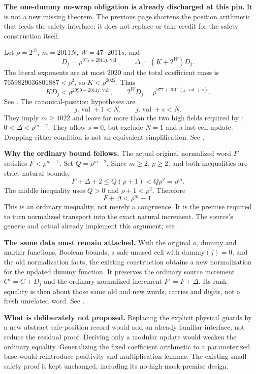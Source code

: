 \textbf{The one-dummy no-wrap obligation is already discharged at this pin.} It is not a new missing theorem. The previous page shortens the position arithmetic that feeds the safety interface; it does not replace or take credit for the safety construction itself.

Let $\rho=2^{47}$, $m=2011N$, $W=47\cdot2011s$, and
\[
 D_j=\rho^{977+2011j.\operatorname{val}},\qquad
 \Delta=(K+2^W)D_j.
\]
The literal exponents are at most $2020$ and the total coefficient mass is $7659829036801887<\rho^2$, so $K<\rho^{2022}$. Thus
\[
 KD_j<\rho^{2999+2011j.\operatorname{val}},\qquad
 2^WD_j=\rho^{977+2011(j.\operatorname{val}+s)}.
\]
See . The canonical-position hypotheses are
\[
 j.\operatorname{val}+1<N,\qquad j.\operatorname{val}+s<N.
\]
They imply $m\ge4022$ and leave far more than the two high fields required by
: $0<\Delta<\rho^{m-2}$. They allow $s=0$, but exclude $N=1$ and a last-cell update. Dropping either condition is not an equivalent simplification. See .

\textbf{Why the ordinary bound follows.} The actual original normalized word $F$ satisfies $F<\rho^{m-1}$. Set $Q=\rho^{m-2}$. Since $m\ge2$, $\rho\ge2$, and both inequalities are strict natural bounds,
\[
 F+\Delta+2\le Q(\rho+1)<Q\rho^2=\rho^m.
\]
The middle inequality uses $Q>0$ and $\rho+1<\rho^2$. Therefore
\[
 F+\Delta<\rho^m-1.
\]
This is an ordinary inequality, not merely a congruence. It is the premise required to turn normalized transport into the exact natural increment. The source's generic  and actual  already implement this argument; see .

\textbf{The same data must remain attached.} With the original $a$, dummy and marker functions, Boolean bounds, a safe unused cell with $\mathrm{dummy}(j)=0$, and the old normalization facts, the existing construction obtains a new normalization for the updated dummy function. It preserves the ordinary source increment $C'=C+D_j$ and the ordinary normalized increment $F'=F+\Delta$. Its rank equality is then about those same old and new words, carries and digits, not a fresh unrelated word. See .

\textbf{What is deliberately not proposed.} Replacing the explicit physical guards by a new abstract safe-position record would add an already familiar interface, not reduce the residual proof. Deriving only a modular update would weaken the ordinary equality. Generalizing the fixed coefficient arithmetic to a parameterized base would reintroduce positivity and multiplication lemmas. The existing small safety proof is kept unchanged, including its no-high-mask-premise design.
